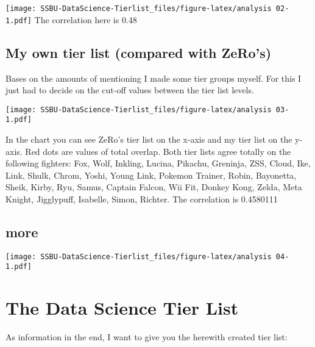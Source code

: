 \documentclass[]{article}
\begin{document}
\texttt{[image: SSBU-DataScience-Tierlist\_files/figure-latex/analysis 02-1.pdf]}
The correlation here is 0.48

\hypertarget{my-own-tier-list-compared-with-zeros}{%
\subsection{My own tier list (compared with
ZeRo's)}\label{my-own-tier-list-compared-with-zeros}}

Bases on the amounts of mentioning I made some tier groups myself. For
this I just had to decide on the cut-off values between the tier list
levels.

\texttt{[image: SSBU-DataScience-Tierlist\_files/figure-latex/analysis 03-1.pdf]}

In the chart you can see ZeRo's tier list on the x-axis and my tier list
on the y-axis. Red dots are values of total overlap. Both tier lists
agree totally on the following fighters: Fox, Wolf, Inkling, Lucina,
Pikachu, Greninja, ZSS, Cloud, Ike, Link, Shulk, Chrom, Yoshi, Young
Link, Pokemon Trainer, Robin, Bayonetta, Sheik, Kirby, Ryu, Samus,
Captain Falcon, Wii Fit, Donkey Kong, Zelda, Meta Knight, Jigglypuff,
Isabelle, Simon, Richter. The correlation is 0.4580111

\hypertarget{more}{%
\subsection{more}\label{more}}

\texttt{[image: SSBU-DataScience-Tierlist\_files/figure-latex/analysis 04-1.pdf]}

\hypertarget{the-data-science-tier-list}{%
\section{The Data Science Tier List}\label{the-data-science-tier-list}}

As information in the end, I want to give you the herewith created tier
list:
\end{document}
